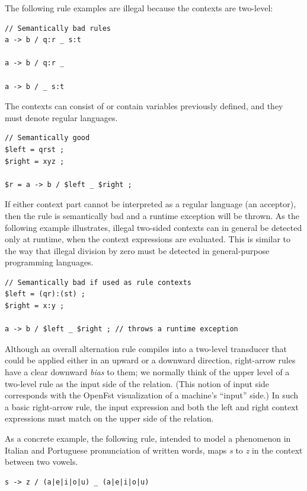 The following rule examples are illegal because the contexts are two-level:

\begin{Verbatim}
// Semantically bad rules
a -> b / q:r _ s:t

a -> b / q:r _

a -> b / _ s:t
\end{Verbatim}

\noindent
The contexts can consist of or contain variables previously defined, and they must denote regular languages.


\begin{Verbatim}
// Semantically good
$left = qrst ;
$right = xyz ;

$r = a -> b / $left _ $right ;
\end{Verbatim}

\noindent
If either context part cannot be interpreted as a regular language (an acceptor), then the rule is semantically bad and
a runtime exception will be thrown.  As the following example illustrates, illegal two-sided contexts can in general be detected
only at runtime, when the context expressions are evaluated.  This is similar to the way that illegal division by zero
must be detected in general-purpose programming languages.

\begin{Verbatim}
// Semantically bad if used as rule contexts
$left = (qr):(st) ;
$right = x:y ;

a -> b / $left _ $right ; // throws a runtime exception
\end{Verbatim}


Although an overall alternation rule compiles into a two-level transducer that could be applied either in an
upward or a downward direction, right-arrow rules have a clear downward \emph{bias} to them;
we normally think of the upper level of a two-level rule as the input side of the
relation.  (This notion of input side corresponds with the OpenFst visualization of a
machine's ``input'' side.)
In such a basic right-arrow rule, the input expression and both the left
and right context expressions must match on the upper side of the relation.

As a concrete example, the following rule, intended to model a phenomenon in Italian and Portuguese
pronunciation of written words, maps \emph{s} to \emph{z} in the context between two vowels.


\begin{Verbatim}
s -> z / (a|e|i|o|u) _ (a|e|i|o|u)
\end{Verbatim}

